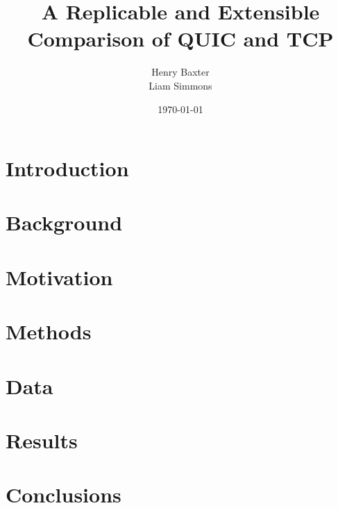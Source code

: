 \documentclass[12pt]{article}
\begin{document}
\title{A Replicable and Extensible Comparison of QUIC and TCP}
\author{Henry Baxter\\
		Liam Simmons}
\date{\today}

\maketitle

\section{Introduction}

\section{Background}

\section{Motivation}

\section{Methods}

\section{Data}

\section{Results}

\section{Conclusions}

{}

\end{document}
